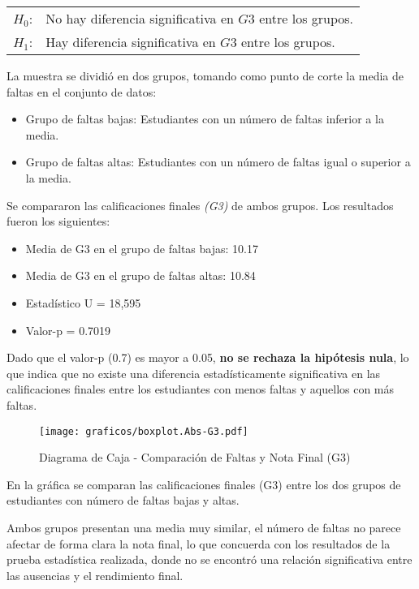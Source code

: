 \documentclass{article}
\begin{document}
\begin{center}
\begin{tabular}{rl}
$H_0$:& No hay diferencia significativa en $G3$ entre los grupos. \\
$H_1$:& Hay diferencia significativa en $G3$ entre los grupos.
\end{tabular}
\end{center}

La muestra se dividió en dos grupos, tomando como punto de corte la media de faltas en el conjunto de datos:
\begin{itemize}
    \item Grupo de faltas bajas: Estudiantes con un número de faltas inferior a la media.
    \item Grupo de faltas altas: Estudiantes con un número de faltas igual o superior a la media.
\end{itemize}

Se compararon las calificaciones finales \textit{(G3)} de ambos grupos. Los resultados fueron los siguientes:
\begin{itemize}[label=\textendash]
    \item Media de G3 en el grupo de faltas bajas: 10.17
    \item Media de G3 en el grupo de faltas altas: 10.84
    \item Estadístico U = 18,595
    \item Valor-p = 0.7019
\end{itemize}

Dado que el valor-p (0.7) es mayor a 0.05, \textbf{no se rechaza la hipótesis nula}, lo que indica que no existe una diferencia estadísticamente significativa en las calificaciones finales entre los estudiantes con menos faltas y aquellos con más faltas. 

\begin{figure}[H]
    \centering
    \texttt{[image: graficos/boxplot.Abs-G3.pdf]}
    \caption{\small Diagrama de Caja - Comparación de Faltas y Nota Final (G3)}
    \label{fig:boxplot}
\end{figure}

En la gráfica se comparan las calificaciones finales (G3) entre los dos grupos de estudiantes con número de faltas bajas y altas.

Ambos grupos presentan una media muy similar, el número de faltas no parece afectar de forma clara la nota final, lo que concuerda con los resultados de la prueba estadística realizada, donde no se encontró una relación significativa entre las ausencias y el rendimiento final.
\end{document}
